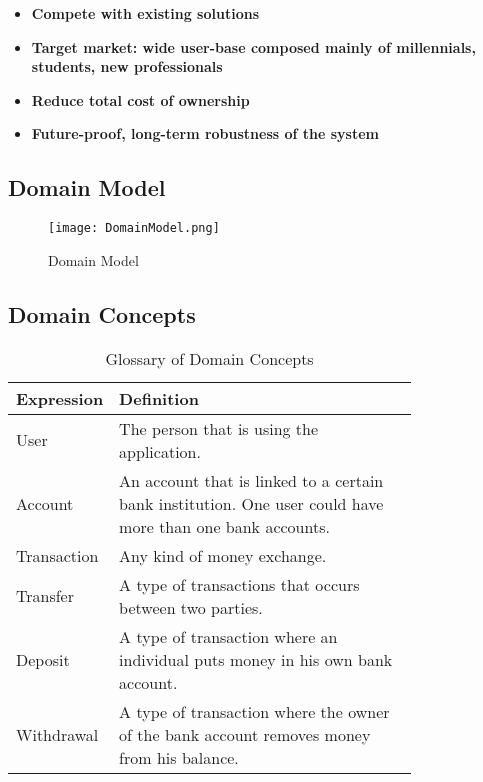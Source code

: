 \documentclass[11pt]{article}
\newcounter{use case ID}
\begin{document}
\begin{itemize}
    \item \textbf{Compete with existing solutions}
    \item \textbf{Target market: wide user-base composed mainly of millennials, students, new professionals}
    \item \textbf{Reduce total cost of ownership}
    \item \textbf{Future-proof, long-term robustness of the system}
\end{itemize}


\subsection{Domain Model}


\begin{figure}[H]
\texttt{[image: DomainModel.png]}
\centering
\caption{Domain Model}
\label{fig:domain-model}
\end{figure}

\subsection{Domain Concepts}


\begin{table}[H]
\caption{Glossary of Domain Concepts}
\begin{center}
\begin{tabular}{|l|p{0.8\linewidth}|}
\hline
Expression &  Definition \\
\hline
User & The person that is using the application.\\
\hline
Account & An account that is linked to a certain bank institution. One user could have more than one bank accounts.\\
\hline
Transaction & Any kind of money exchange.\\
\hline
Transfer & A type of transactions that occurs between two parties.\\
\hline
Deposit & A type of transaction where an individual puts money in his own bank account.\\
\hline
Withdrawal & A type of transaction where the owner of the bank account removes money from his balance.\\
\hline
\end{tabular}
\end{center}
\end{table}
\end{document}
